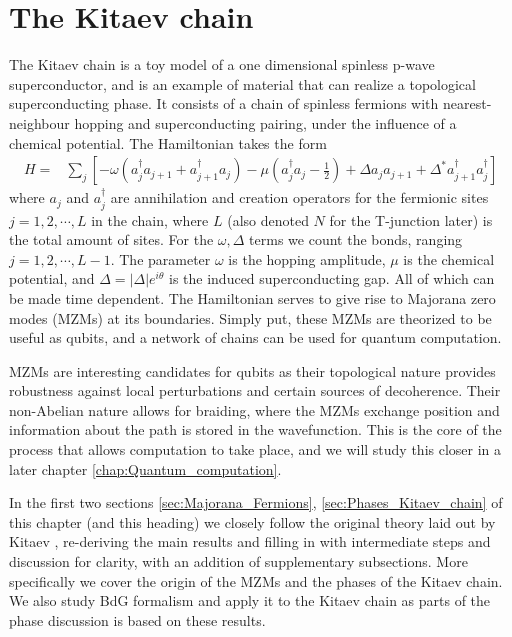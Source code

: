 \chapter{The Kitaev chain}
The Kitaev chain is a toy model of a one dimensional spinless p-wave superconductor, and is an example of material that can realize a topological superconducting phase. It consists of a chain of spinless fermions with nearest-neighbour hopping and superconducting pairing, under the influence of a chemical potential. The Hamiltonian takes the form 
\begin{align}
    H =& \sum_j\left[ - \omega \left(a_j^\dagger a_{j+1} + a_{j+1}^\dagger a_j  \right) - \mu \left(a_j^\dagger  a_j - \frac{1}{2} \right) + \Delta a_j a_{j+1} + \Delta^* a_{j+1}^\dagger a_j^\dagger \right]
    \label{eq:Original_Kitaev_Hamiltonian}
\end{align}
where $a_j$ and $a_j^\dagger$ are annihilation and creation operators for the fermionic sites $j = 1, 2, \cdots, L$ in the chain, where $L$ (also denoted $N$ for the T-junction later) is the total amount of sites. For the $\omega, \Delta$ terms we count the bonds, ranging $j = 1, 2, \cdots, L-1$. The parameter $\omega$ is the hopping amplitude, $\mu$ is the chemical potential, and $\Delta = |\Delta|e^{i\theta}$ is the induced superconducting gap. All of which can be made time dependent. The Hamiltonian serves to give rise to Majorana zero modes (MZMs) at its boundaries. Simply put, these MZMs are theorized to be useful as qubits, and a network of chains can be used for quantum computation. 

MZMs are interesting candidates for qubits as their topological nature provides robustness against local perturbations and certain sources of decoherence. Their non-Abelian nature allows for braiding, where the MZMs exchange position and information about the path is stored in the wavefunction. This is the core of the process that allows computation to take place, and we will study this closer in a later chapter \ref{chap:Quantum_computation}. 

In the first two sections \ref{sec:Majorana_Fermions}, \ref{sec:Phases_Kitaev_chain} of this chapter (and this heading) we closely follow the original theory laid out by Kitaev  \cite{kitaevUnpairedMajoranaFermions2001a}, re-deriving the main results and filling in with intermediate steps and discussion for clarity, with an addition of supplementary subsections. More specifically we cover the origin of the MZMs and the phases of the Kitaev chain. We also study BdG formalism and apply it to the Kitaev chain as parts of the phase discussion is based on these results. 

